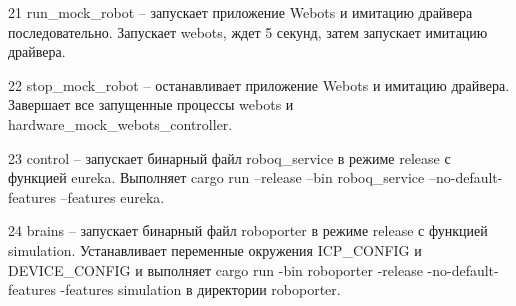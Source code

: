 21                     {run\_mock\_robot} -- запускает приложение Webots и имитацию драйвера
последовательно. Запускает webots, ждет 5 секунд, затем запускает имитацию
драйвера.

22                      {stop\_mock\_robot} -- останавливает приложение Webots и имитацию
драйвера. Завершает все запущенные процессы webots и
hardware\_mock\_webots\_controller.

23                       {control} -- запускает бинарный файл roboq\_service в режиме release с
функцией eureka. Выполняет cargo run --release --bin roboq\_service
--no-default-features --features eureka.

24                        {brains} -- запускает бинарный файл roboporter в режиме release с
функцией simulation. Устанавливает переменные окружения ICP\_CONFIG и
DEVICE\_CONFIG и выполняет cargo run -bin roboporter -release
-no-default-features -features simulation в директории roboporter.


